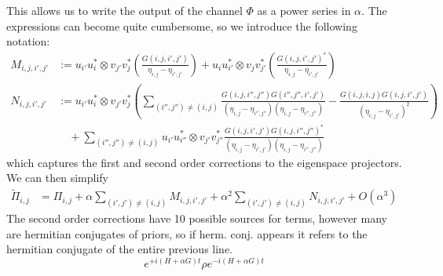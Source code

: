 \documentclass{article}
\newcommand{\parens}[1]{\left( #1 \right)}
\newcommand{\bigo}[1]{O\left( #1 \right)}
\begin{document}
This allows us to write the output of the channel $\Phi$ as a power series in $\alpha$. The expressions can become quite cumbersome, so we introduce the following notation:
\begin{align}
    M_{i,j,i',j'} &:=  u_{i'} u_i^* \otimes v_{j'} v_j^* \parens{  \frac{G(i,j,i',j')}{\eta_{i,j} - \eta_{i',j'}} } +  u_i u_{i'}^* \otimes v_j v_{j'}^* \parens{  \frac{G(i,j,i',j')^*}{\eta_{i,j} - \eta_{i',j'}} } \\
    N_{i,j,i',j'} &:= u_{i'} u_i^* \otimes v_{j'} v_j^* \parens{ \sum_{(i'',j'') \neq (i,j)} \frac{G(i,j,i'',j'') G(i'',j'',i',j')}{(\eta_{i,j} - \eta_{i'',j''})(\eta_{i,j} - \eta_{i'',j''})} -  \frac{G(i,j,i,j) G(i,j,i',j')}{(\eta_{i,j} - \eta_{i',j'})^2}} \\
    & \quad + \sum_{(i'',j'') \neq (i,j)} u_{i'}u_{i''}^* \otimes v_{j'} v_{j''}^* \frac{G(i,j,i',j') G(i,j,i'',j'')^*}{(\eta_{i,j} - \eta_{i',j'})(\eta_{i,j} - \eta_{i'',j''})}
\end{align}
which captures the first and second order corrections to the eigenspace projectors. We can then simplify
\begin{align}
    \widetilde{\Pi}_{i,j} &= \Pi_{i,j} + \alpha \sum_{(i',j') \neq (i,j)} M_{i,j,i',j'} + \alpha^2 \sum_{(i',j') \neq (i,j)} N_{i,j,i',j'} + \bigo{\alpha^3}
\end{align}
The second order corrections have 10 possible sources for terms, however many are hermitian conjugates of priors, so if herm. conj. appears it refers to the hermitian conjugate of the entire previous line.
\newpage
\begin{equation}
    e^{+i(H + \alpha G)t} \rho e^{-i (H + \alpha G) t}
\end{equation}
\end{document}
